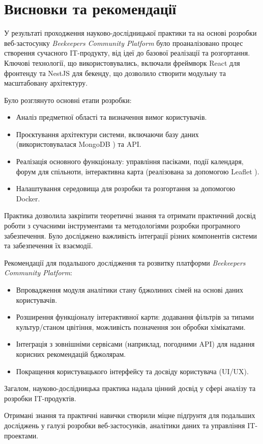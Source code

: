 \section*{Висновки та рекомендації}
\label{sec:conclusions_recommendations}

У результаті проходження науково-дослідницької практики та на основі розробки веб-застосунку \textit{Beekeepers Community Platform} було проаналізовано процес створення сучасного IT-продукту, від ідеї до базової реалізації та розгортання. Ключові технології, що використовувались, включали фреймворк React \cite{react} для фронтенду та NestJS \cite{nestjs} для бекенду, що дозволило створити модульну та масштабовану архітектуру.

Було розглянуто основні етапи розробки:
\begin{itemize}
    \item Аналіз предметної області та визначення вимог користувачів.
    \item Проєктування архітектури системи, включаючи базу даних (використовувалася MongoDB \cite{mongodb}) та API.
    \item Реалізація основного функціоналу: управління пасіками, події календаря, форум для спільноти, інтерактивна карта (реалізована за допомогою Leaflet \cite{leaflet}).
    \item Налаштування середовища для розробки та розгортання за допомогою Docker.
\end{itemize}

Практика дозволила закріпити теоретичні знання та отримати практичний досвід роботи з сучасними інструментами та методологіями розробки програмного забезпечення. Було досліджено важливість інтеграції різних компонентів системи та забезпечення їх взаємодії.

Рекомендації для подальшого дослідження та розвитку платформи \textit{Beekeepers Community Platform}:
\begin{itemize}
    \item Впровадження модуля аналітики стану бджолиних сімей на основі даних користувачів.
    \item Розширення функціоналу інтерактивної карти: додавання фільтрів за типами культур/станом цвітіння, можливість позначення зон обробки хімікатами.
    \item Інтеграція з зовнішніми сервісами (наприклад, погодними API) для надання корисних рекомендацій бджолярам.
    \item Покращення користувацького інтерфейсу та досвіду користувача (UI/UX).
\end{itemize}

Загалом, науково-дослідницька практика надала цінний досвід у сфері аналізу та розробки IT-продуктів.

Отримані знання та практичні навички створили міцне підґрунтя для подальших досліджень у галузі розробки веб-застосунків, аналітики даних та управління IT-проектами.
\newpage 